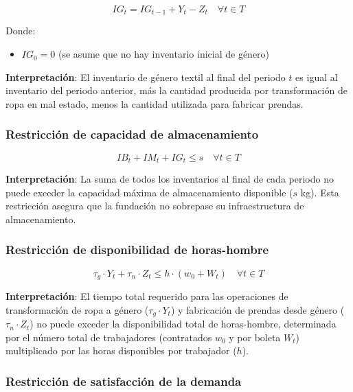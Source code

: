 \begin{equation}
IG_t = IG_{t-1} + Y_t - Z_t \quad \forall t \in T
\end{equation}

Donde:
\begin{itemize}
    \item $IG_0 = 0$ (se asume que no hay inventario inicial de género)
\end{itemize}

\textbf{Interpretación}: El inventario de género textil al final del periodo $t$ es igual al inventario del periodo anterior, más la cantidad producida por transformación de ropa en mal estado, menos la cantidad utilizada para fabricar prendas.

\subsubsection*{Restricción de capacidad de almacenamiento}

\begin{equation}
IB_t + IM_t + IG_t \leq s \quad \forall t \in T
\end{equation}

\textbf{Interpretación}: La suma de todos los inventarios al final de cada periodo no puede exceder la capacidad máxima de almacenamiento disponible ($s$ kg). Esta restricción asegura que la fundación no sobrepase su infraestructura de almacenamiento.

\subsubsection*{Restricción de disponibilidad de horas-hombre}

\begin{equation}
\tau_g \cdot Y_t + \tau_n \cdot Z_t \leq h \cdot (w_0 + W_t) \quad \forall t \in T
\end{equation}

\textbf{Interpretación}: El tiempo total requerido para las operaciones de transformación de ropa a género ($\tau_g \cdot Y_t$) y fabricación de prendas desde género ($\tau_n \cdot Z_t$) no puede exceder la disponibilidad total de horas-hombre, determinada por el número total de trabajadores (contratados $w_0$ y por boleta $W_t$) multiplicado por las horas disponibles por trabajador ($h$).

\subsubsection*{Restricción de satisfacción de la demanda}

